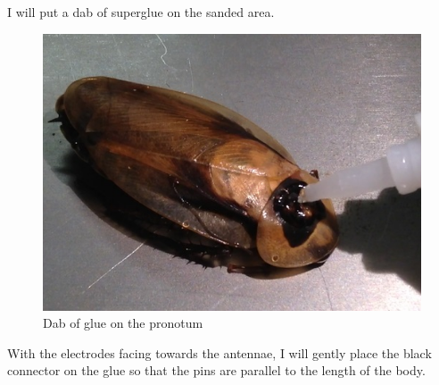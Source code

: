 I will put a dab of superglue on the sanded area. 
{\begin{figure}[ht!]
\centering
\includegraphics[scale=0.5]{Surgery Photos/gluepronotum.jpg}
\caption{Dab of glue on the pronotum}
\label{fig:gluepronotum}
\end{figure}}
With the electrodes facing towards the antennae, I will gently place the black connector on the glue so that the pins are parallel to the length of the body. 
